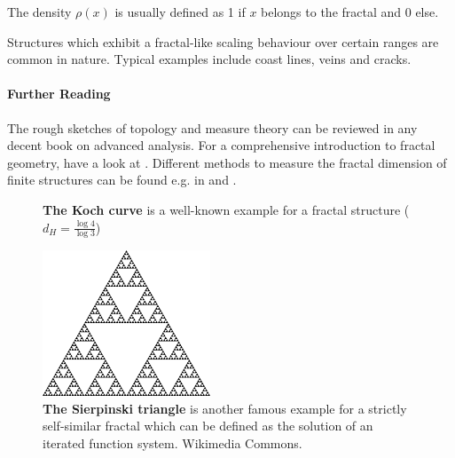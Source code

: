 \documentclass[twocolumn, 10pt]{scrartcl}
\begin{document}
            The density $\rho(x)$ is usually defined as 1 if $x$ belongs to the fractal and 0 else.

            Structures which exhibit a fractal-like scaling behaviour over certain ranges are common in nature. Typical
            examples include coast lines, veins and cracks.

        {\small
            \paragraph{Further Reading}
            The rough sketches of topology and measure theory can be reviewed in any decent book on advanced analysis.
            For a comprehensive introduction to fractal geometry, have a look at \cite{src-mandelbrot}. Different
            methods to measure the fractal dimension of finite structures can be found e.g. in \cite{src-stanley} and
            \cite{src-wittensander}.
        }

        \begin{figure}
            \center
            \caption[The Koch curve]
                {\small\textbf{The Koch curve} is a well-known example for a fractal structure ($d_H=\frac{\log 4}
                    {\log 3}$)}
            \label{fig-koch}
        \end{figure}

        \begin{figure}
            \center
            \includegraphics[width=5cm]{img/sierpinski.png}
            \caption[The Sierpinski Triangle]
                {\small\textbf{The Sierpinski triangle} is another famous example for a strictly self-similar fractal
                which can be defined as the solution of an iterated function system. Wikimedia Commons.}
            \label{fig-sierpinski}
        \end{figure}
\end{document}

